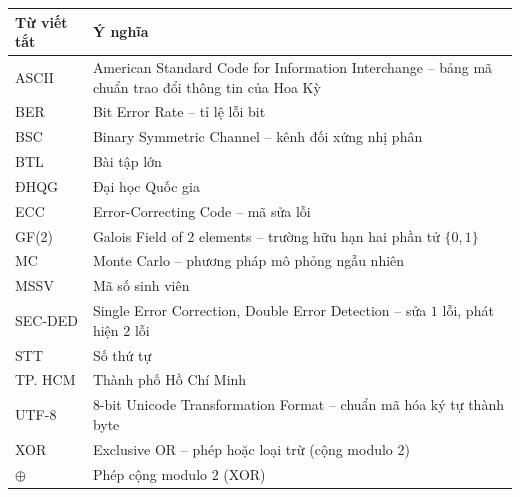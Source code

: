 
\begin{center}
\renewcommand{\arraystretch}{1.3}
\begin{tabular}{|p{2.8cm}|p{11.7cm}|}
\hline
\textbf{Từ viết tắt} & \textbf{Ý nghĩa}\\ \hline
ASCII   & American Standard Code for Information Interchange -- bảng mã chuẩn
          trao đổi thông tin của Hoa Kỳ\\ \hline
BER     & Bit Error Rate -- tỉ lệ lỗi bit\\ \hline
BSC     & Binary Symmetric Channel -- kênh đối xứng nhị phân\\ \hline
BTL     & Bài tập lớn\\ \hline
ĐHQG    & Đại học Quốc gia\\ \hline
ECC     & Error-Correcting Code -- mã sửa lỗi\\ \hline
GF(2)   & Galois Field of 2 elements -- trường hữu hạn hai phần tử $\{0, 1\}$\\ \hline
MC      & Monte Carlo -- phương pháp mô phỏng ngẫu nhiên\\ \hline
MSSV    & Mã số sinh viên\\ \hline
SEC-DED & Single Error Correction, Double Error Detection -- sửa $1$ lỗi, phát
          hiện $2$ lỗi\\ \hline
STT     & Số thứ tự\\ \hline
TP. HCM & Thành phố Hồ Chí Minh\\ \hline
UTF-8   & 8-bit Unicode Transformation Format -- chuẩn mã hóa ký tự thành
          byte\\ \hline
XOR     & Exclusive OR -- phép hoặc loại trừ (cộng modulo $2$)\\ \hline
$\oplus$ & Phép cộng modulo $2$ (XOR)\\ \hline
\end{tabular}
\end{center}
